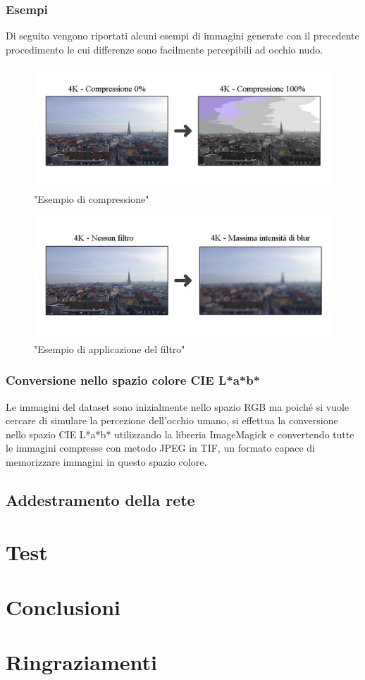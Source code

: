 \documentclass[a4paper,11pt]{article}
\begin{document}
    \newpage
    \subsubsection{Esempi}
    Di seguito vengono riportati alcuni esempi di immagini generate con il precedente procedimento le cui differenze sono facilmente percepibili ad occhio nudo.
    \begin{figure}[h]
        \centering
        \includegraphics[scale=0.325]{compressione}
        \caption{"Esempio di compressione"}
    \end{figure}
    
    \begin{figure}[h]
        \centering
        \includegraphics[scale=0.325]{blur}
        \caption{"Esempio di applicazione del filtro"}
    \end{figure}
    \subsubsection{Conversione nello spazio colore CIE L*a*b*}
    Le immagini del dataset sono inizialmente nello spazio RGB ma poiché si vuole cercare di simulare la percezione dell'occhio umano,
    si effettua la conversione nello spazio CIE L*a*b* utilizzando la libreria ImageMagick e convertendo tutte le immagini compresse con metodo JPEG in TIF, un formato capace di memorizzare immagini in questo spazio colore.
    \newpage

    \subsection{Addestramento della rete}
    \lipsum[1-3]

    \newpage
    \section{Test}
    \lipsum[1-3]

    \newpage
    \section{Conclusioni} 
    \lipsum[1-3]

    \newpage
    \section{Ringraziamenti}
    \lipsum[1-3]
    
\end{document}
